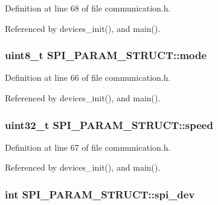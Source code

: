 Definition at line 68 of file communication.\-h.



Referenced by devices\-\_\-init(), and main().

\hypertarget{structSPI__PARAM__STRUCT_a82c546c99f6c3daed73c1e23426be847}{
\subsubsection[{mode}]{\setlength{\rightskip}{0pt plus 5cm}uint8\-\_\-t S\-P\-I\-\_\-\-P\-A\-R\-A\-M\-\_\-\-S\-T\-R\-U\-C\-T\-::mode}}\label{structSPI__PARAM__STRUCT_a82c546c99f6c3daed73c1e23426be847}


Definition at line 66 of file communication.\-h.



Referenced by devices\-\_\-init(), and main().

\hypertarget{structSPI__PARAM__STRUCT_a53a8d386594a81eb9bc6f971bfe36c54}{
\subsubsection[{speed}]{\setlength{\rightskip}{0pt plus 5cm}uint32\-\_\-t S\-P\-I\-\_\-\-P\-A\-R\-A\-M\-\_\-\-S\-T\-R\-U\-C\-T\-::speed}}\label{structSPI__PARAM__STRUCT_a53a8d386594a81eb9bc6f971bfe36c54}


Definition at line 67 of file communication.\-h.



Referenced by devices\-\_\-init(), and main().

\hypertarget{structSPI__PARAM__STRUCT_abe385c44333d268d17cf648c8e371cad}{
\subsubsection[{spi\-\_\-dev}]{\setlength{\rightskip}{0pt plus 5cm}int S\-P\-I\-\_\-\-P\-A\-R\-A\-M\-\_\-\-S\-T\-R\-U\-C\-T\-::spi\-\_\-dev}}\label{structSPI__PARAM__STRUCT_abe385c44333d268d17cf648c8e371cad}



